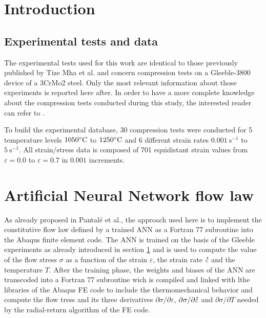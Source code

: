 \documentclass[algorithms,article,submit,pdftex,moreauthors]{Definitions/mdpi}
\makeatletter
\DeclareRobustCommand{\mdot}[1]{\accentset{\mbox{\bfseries .}}{#1}}
\DeclareRobustCommand{\eal}{et al.\@\xspace}
\DeclareRobustCommand{\ps}{\text{s}^{-1}}
\makeatother
\begin{document}
\section{Introduction}\label{sec:Introduction}

\subsection{Experimental tests and data}
The experimental tests used for this work are identical to those previously published by Tize Mha \eal \cite{Tize-2023-IEP} and concern compression tests on a Gleeble-3800 device of a 3CrMo2 steel.
Only the most relevant information about those experiments is reported here after.
In order to have a more complete knowledge about the compression tests conducted during this study, the interested reader can refer to \cite{Tize-2023-IEP}.

To build the experimental database, 30 compression tests were conducted for 5 temperature levels $1050\celsius$ to $1250\celsius$ and 6 different strain rates $0.001~\ps$ to $5~\ps$.
All strain/stress data is composed of 701 equidistant strain values from $\varepsilon=0.0$ to $\varepsilon=0.7$ in $0.001$ increments.

\section{Artificial Neural Network flow law}\label{sec:ANN}
As already proposed in Pantalé \eal \cite{Pantale-2021-EIN, Pantale-2023-DIA}, the approach used here is to implement the constitutive flow law defined by a trained ANN as a Fortran 77 subroutine into the Abaqus finite element code. 
The ANN is trained on the basis of the Gleeble experiments as already introduced in section \ref{sec:Introduction} and is used to compute the value of the flow stress $\sigma$ as a function of the strain $\varepsilon$, the strain rate $\mdot{\varepsilon}$ and the temperature $T$.
After the training phase, the weights and biases of the ANN are transcoded into a Fortran 77 subroutine wich is compiled and linked with lthe libraries of the Abaqus FE code to include the thermomechanical behavior and compute the flow tress and its three derivatives $\partial\sigma/\partial\varepsilon$, $\partial\sigma/\partial\mdot{\varepsilon}$ and $\partial\sigma/\partial T$ needed by the radial-return algorithm of the FE code.
\end{document}
